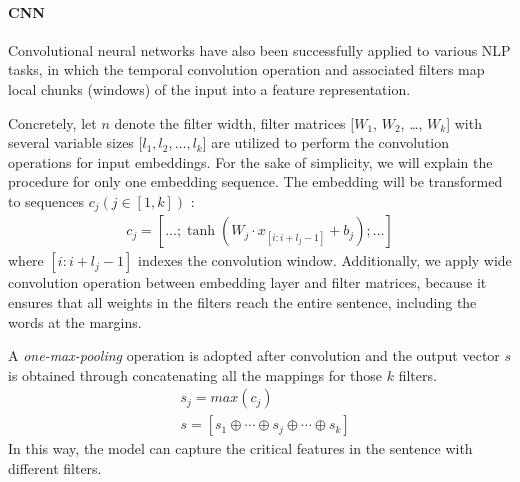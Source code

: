 \documentclass[11pt,a4paper]{article}
\begin{document}
	\paragraph{CNN}
	Convolutional neural networks have also been successfully applied to various NLP tasks, in which the temporal convolution operation and associated filters map local chunks (windows) of
	the input into a feature representation. 
	
	Concretely, let $n$ denote the filter width, filter matrices [$W_1$, $W_2$, \dots , $W_k$] with several variable sizes  [$l_1, l_2,\dots , l_k$] are utilized to perform the  convolution operations for input embeddings. For the sake of simplicity, we will explain the procedure for only one embedding sequence. The embedding will be transformed to sequences $c_j (j \in [1, k])$ : 
	\begin{align*}
	{c}_j  = [\dots; \tanh ({W}_j\cdot {x}_{[i:i+l_j-1]} + {b}_j); \dots]
	\end{align*}
	where $[i:i+l_j-1]$ indexes the convolution window. Additionally, we apply wide convolution operation between embedding layer and filter matrices, because it ensures that all weights in the filters reach the entire sentence, including the words at the margins.
	
	A \emph{one-max-pooling} operation is adopted after convolution and the output vector ${s}$ is obtained through concatenating all the mappings for those $k$ filters.
	\begin{align*}
	&s_{j} = {max}(c_{j}) \\
	&s = [s_{1}\oplus \cdots  \oplus s_{j} \oplus \cdots \oplus s_{k}]
	\end{align*}
	In this way, the model can capture the critical features in the sentence with different filters.
	
\end{document}
